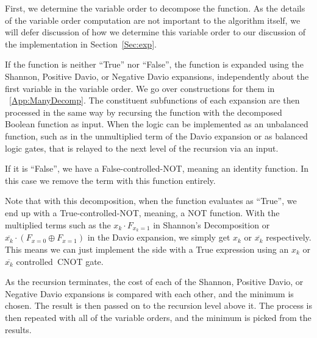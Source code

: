 First, we determine the variable order to decompose the function. As the details of the variable order
computation are not important to the algorithm itself, we will defer discussion of how we determine
this variable order to our discussion of the implementation in Section~\ref{Sec:exp}.

If the function is neither ``True'' nor ``False'', the function is expanded using the Shannon, Positive
Davio, or Negative Davio expansions, independently about the first variable in the variable order.
We go over constructions for them in ~\ref{App:ManyDecomp}.
The constituent subfunctions of each expansion are then processed in the same way by
recursing the function with the decomposed Boolean function as input. When the logic can be implemented as an
unbalanced function, such as in the unmultiplied term of the Davio expansion or as balanced logic gates, that is
relayed to the next level of the recursion via an input.

If it is ``False'', we have a False-controlled-NOT, meaning an identity function. In this case we remove the term
with this function entirely.

Note that with this decomposition, when the function evaluates as ``True'', we end up with a True-controlled-NOT, meaning, a NOT function. With the multiplied terms such as the $x_k \cdot F_{{x_k}=1}$ in Shannon's Decomposition or $\overline{x_k} \cdot (F_{x=0} \oplus F_{x=1})$ in the Davio expansion, we simply get $x_k$ or $\overline{x_k}$ respectively. This means we can just implement the side with a True expression using an $x_k$ or $\overline{x_k}$ controlled~CNOT gate. 

As the recursion terminates, the cost of each of the Shannon, Positive Davio, or Negative Davio expansions is
compared with each other, and the minimum is chosen. The result is then passed on to the recursion level above it.
The process is then repeated with all of the variable orders, and the minimum is picked from the results. 


